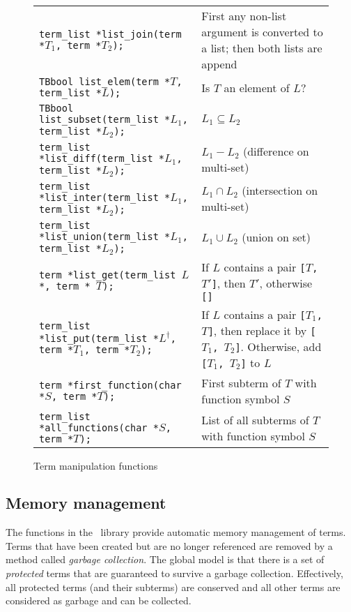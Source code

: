\documentclass[a4,twoside,noweb]{article} %
\begin{document}
\begin{figure}[tb]
\begin{center}
\begin{tabular}{|l|p{5cm}|}
{\tt term\_list *list\_join(term *$T_1$, term *$T_2$);}				& First any non-list argument is converted
										  to a list; then both lists are append\\
{\tt TBbool     list\_elem(term *$T$, term\_list *$L$);}				& Is $T$ an element of $L$?\\

{\tt TBbool     list\_subset(term\_list *$L_1$, term\_list *$L_2$);}		& $L_1 \subseteq L_2$\\
{\tt term\_list *list\_diff(term\_list *$L_1$, term\_list *$L_2$);}		& $L_1 - L_2$ (difference on multi-set)\\
{\tt term\_list *list\_inter(term\_list *$L_1$, term\_list *$L_2$);}		& $L_1 \cap L_2$ (intersection on multi-set)\\
{\tt term\_list *list\_union(term\_list *$L_1$, term\_list *$L_2$);}		& $L_1 \cup L_2$ (union on set)\\ \hline
{\tt term      *list\_get(term\_list $L$*, term * $T$);}		& If $L$ contains a pair {\tt [$T$, $T'$]}, then
									  $T'$, otherwise {\tt []}\\
{\tt term\_list *list\_put(term\_list *$L^{\dag}$, term *$T_1$, term *$T_2$);}
									& If $L$ contains a pair {\tt [$T_1$, $T$]}, then
									  replace it by  {\tt [$T_1$, $T_2$]}. Otherwise,
									  add {\tt [$T_1$, $T_2$]} to $L$\\ \hline
{\tt term  *first\_function(char *$S$, term *$T$);}		& First subterm of $T$ with function symbol $S$\\
{\tt term\_list  *all\_functions(char *$S$, term *$T$);}		& List of all subterms of $T$ with function symbol $S$\\
\hline
\end{tabular}
\caption{Term manipulation functions}
\label{fig:TermMan}
\end{center}
\end{figure}

\subsection{\label{Memory}Memory management}
The functions in the \TB\ library provide automatic memory management
of terms.  Terms that have been created but are no longer referenced
are removed by a method called {\em garbage collection}.  The global
model is that there is a set of {\em protected} terms that are
guaranteed to survive a garbage collection.  Effectively, all
protected terms (and their subterms) are conserved and all other terms
are considered as garbage and can be collected.
\end{document}
